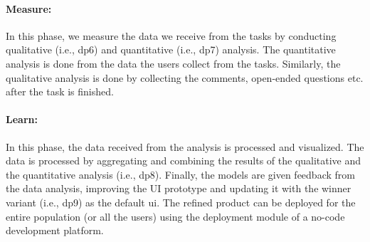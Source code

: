 \paragraph{Measure:}
\label{design:paragraph:measure}
In this phase, we measure the data we receive from the tasks by conducting qualitative (i.e., \ac{dp}6) and quantitative (i.e., \ac{dp}7) analysis.
The quantitative analysis is done from the data the users collect from the tasks.
Similarly, the qualitative analysis is done by collecting the comments, open-ended questions etc. after the task is finished. 
\paragraph{Learn:}
\label{design:paragraph:learn}
In this phase, the data received from the analysis is processed and visualized. 
The data is processed by aggregating and combining the results of the qualitative and the quantitative analysis (i.e., \ac{dp}8). 
Finally, the models are given feedback from the data analysis, improving the UI prototype and updating it with the winner variant (i.e., \ac{dp}9) as the default \ac{ui}.
The refined product can be deployed for the entire population (or all the users) using the deployment module of a no-code development platform.
